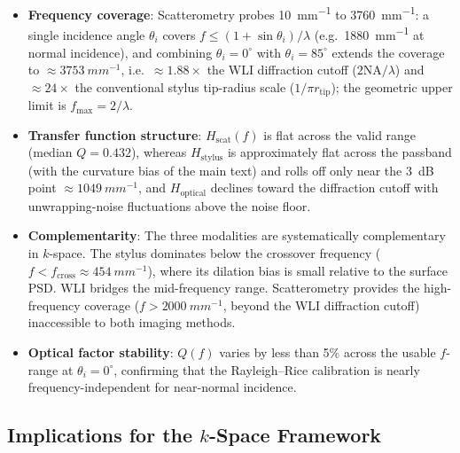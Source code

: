 \documentclass[review,12pt]{elsarticle}
\begin{document}
\begin{itemize}
    \item \textbf{Frequency coverage}: Scatterometry probes \SI{10}{mm^{-1}} to \SI{3760}{mm^{-1}}: a single incidence angle $\theta_i$ covers $f \leq (1+\sin\theta_i)/\lambda$ (e.g.\ \SI{1880}{mm^{-1}} at normal incidence), and combining $\theta_i = 0^\circ$ with $\theta_i = 85^\circ$ extends the coverage to $\approx\SI{3753}{mm^{-1}}$, i.e.\ $\approx1.88\times$ the WLI diffraction cutoff ($2\mathrm{NA}/\lambda$) and $\approx24\times$ the conventional stylus tip-radius scale ($1/\pi r_\mathrm{tip}$); the geometric upper limit is $f_\mathrm{max} = 2/\lambda$.
    \item \textbf{Transfer function structure}: $H_\mathrm{scat}(f)$ is flat across the valid range (median $Q = 0.432$), whereas $H_\mathrm{stylus}$ is approximately flat across the passband (with the curvature bias of the main text) and rolls off only near the \SI{3}{dB} point $\approx\SI{1049}{mm^{-1}}$, and $H_\mathrm{optical}$ declines toward the diffraction cutoff with unwrapping-noise fluctuations above the noise floor.
    \item \textbf{Complementarity}: The three modalities are systematically complementary in $k$-space. The stylus dominates below the crossover frequency ($f < f_\mathrm{cross} \approx \SI{454}{mm^{-1}}$), where its dilation bias is small relative to the surface PSD. WLI bridges the mid-frequency range. Scatterometry provides the high-frequency coverage ($f > \SI{2000}{mm^{-1}}$, beyond the WLI diffraction cutoff) inaccessible to both imaging methods.
    \item \textbf{Optical factor stability}: $Q(f)$ varies by less than 5\% across the usable $f$-range at $\theta_i = 0^\circ$, confirming that the Rayleigh--Rice calibration is nearly frequency-independent for near-normal incidence.
\end{itemize}

\subsection{Implications for the $k$-Space Framework}
\end{document}
